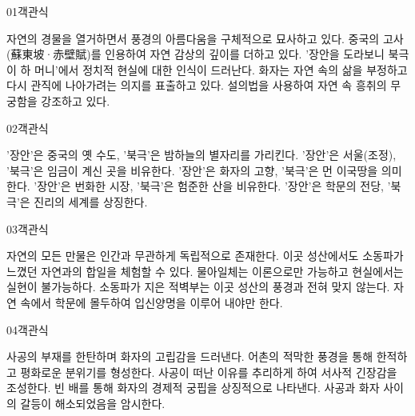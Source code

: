 \documentclass[fs85,seriesWit]{korfarm-base}
\begin{document}
\kfBeginMC
\begin{kfQBlock}{01}{객관식}
\begin{kfChoices}
\kfChoice 자연의 경물을 열거하면서 풍경의 아름다움을 구체적으로 묘사하고 있다.
\kfChoice 중국의 고사(蘇東坡·赤壁賦)를 인용하여 자연 감상의 깊이를 더하고 있다.
\kfChoice '장안을 도라보니 북극이 하 머니'에서 정치적 현실에 대한 인식이 드러난다.
\kfChoice 화자는 자연 속의 삶을 부정하고 다시 관직에 나아가려는 의지를 표출하고 있다.
\kfChoice 설의법을 사용하여 자연 속 흥취의 무궁함을 강조하고 있다.
\end{kfChoices}
\end{kfQBlock}

\begin{kfQBlock}{02}{객관식}
\begin{kfChoices}
\kfChoice '장안'은 중국의 옛 수도, '북극'은 밤하늘의 별자리를 가리킨다.
\kfChoice '장안'은 서울(조정), '북극'은 임금이 계신 곳을 비유한다.
\kfChoice '장안'은 화자의 고향, '북극'은 먼 이국땅을 의미한다.
\kfChoice '장안'은 번화한 시장, '북극'은 험준한 산을 비유한다.
\kfChoice '장안'은 학문의 전당, '북극'은 진리의 세계를 상징한다.
\end{kfChoices}
\end{kfQBlock}

\begin{kfQBlock}{03}{객관식}
\begin{kfChoices}
\kfChoice 자연의 모든 만물은 인간과 무관하게 독립적으로 존재한다.
\kfChoice 이곳 성산에서도 소동파가 느꼈던 자연과의 합일을 체험할 수 있다.
\kfChoice 물아일체는 이론으로만 가능하고 현실에서는 실현이 불가능하다.
\kfChoice 소동파가 지은 적벽부는 이곳 성산의 풍경과 전혀 맞지 않는다.
\kfChoice 자연 속에서 학문에 몰두하여 입신양명을 이루어 내야만 한다.
\end{kfChoices}
\end{kfQBlock}

\begin{kfQBlock}{04}{객관식}
\begin{kfChoices}
\kfChoice 사공의 부재를 한탄하며 화자의 고립감을 드러낸다.
\kfChoice 어촌의 적막한 풍경을 통해 한적하고 평화로운 분위기를 형성한다.
\kfChoice 사공이 떠난 이유를 추리하게 하여 서사적 긴장감을 조성한다.
\kfChoice 빈 배를 통해 화자의 경제적 궁핍을 상징적으로 나타낸다.
\kfChoice 사공과 화자 사이의 갈등이 해소되었음을 암시한다.
\end{kfChoices}
\end{kfQBlock}
\end{document}
